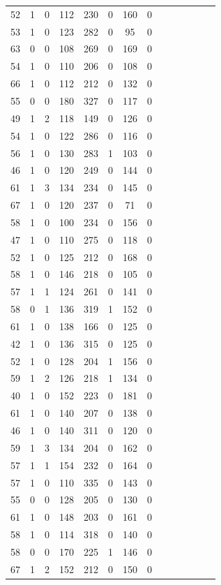 \documentclass{article}
\begin{document}
\begin{longtable}{|c|c|c|c|c|c|c|c|c|c|c|c|c|c|}
52 & 1 & 0 & 112 & 230 & 0 & 160 & 0\\
53 & 1 & 0 & 123 & 282 & 0 & 95 & 0\\
63 & 0 & 0 & 108 & 269 & 0 & 169 & 0\\
54 & 1 & 0 & 110 & 206 & 0 & 108 & 0\\
66 & 1 & 0 & 112 & 212 & 0 & 132 & 0\\
55 & 0 & 0 & 180 & 327 & 0 & 117 & 0\\
49 & 1 & 2 & 118 & 149 & 0 & 126 & 0\\
54 & 1 & 0 & 122 & 286 & 0 & 116 & 0\\
56 & 1 & 0 & 130 & 283 & 1 & 103 & 0\\
46 & 1 & 0 & 120 & 249 & 0 & 144 & 0\\
61 & 1 & 3 & 134 & 234 & 0 & 145 & 0\\
67 & 1 & 0 & 120 & 237 & 0 & 71 & 0\\
58 & 1 & 0 & 100 & 234 & 0 & 156 & 0\\
47 & 1 & 0 & 110 & 275 & 0 & 118 & 0\\
52 & 1 & 0 & 125 & 212 & 0 & 168 & 0\\
58 & 1 & 0 & 146 & 218 & 0 & 105 & 0\\
57 & 1 & 1 & 124 & 261 & 0 & 141 & 0\\
58 & 0 & 1 & 136 & 319 & 1 & 152 & 0\\
61 & 1 & 0 & 138 & 166 & 0 & 125 & 0\\
42 & 1 & 0 & 136 & 315 & 0 & 125 & 0\\
52 & 1 & 0 & 128 & 204 & 1 & 156 & 0\\
59 & 1 & 2 & 126 & 218 & 1 & 134 & 0\\
40 & 1 & 0 & 152 & 223 & 0 & 181 & 0\\
61 & 1 & 0 & 140 & 207 & 0 & 138 & 0\\
46 & 1 & 0 & 140 & 311 & 0 & 120 & 0\\
59 & 1 & 3 & 134 & 204 & 0 & 162 & 0\\
57 & 1 & 1 & 154 & 232 & 0 & 164 & 0\\
57 & 1 & 0 & 110 & 335 & 0 & 143 & 0\\
55 & 0 & 0 & 128 & 205 & 0 & 130 & 0\\
61 & 1 & 0 & 148 & 203 & 0 & 161 & 0\\
58 & 1 & 0 & 114 & 318 & 0 & 140 & 0\\
58 & 0 & 0 & 170 & 225 & 1 & 146 & 0\\
67 & 1 & 2 & 152 & 212 & 0 & 150 & 0\\

\end{longtable}
\end{document}
